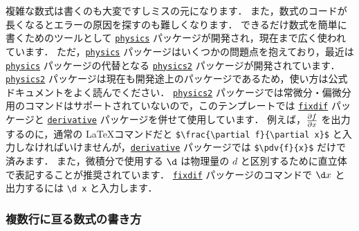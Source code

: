 \documentclass[
    paper=a4paper,      %
    article,            %
    fontsize=11pt,      %
    jafontsize=11pt,    %
    head_space=25mm,    %
    foot_space=25mm,    %
    gutter=20mm,        %
    fore-edge=20mm      %
    ]{jlreq}            %
\begin{document}
複雑な数式は書くのも大変ですしミスの元になります．
また，数式のコードが長くなるとエラーの原因を探すのも難しくなります．
できるだけ数式を簡単に書くためのツールとして \href{https://ctan.org/pkg/physics}{\texttt{physics}} パッケージが開発され，現在まで広く使われています．
ただ，\href{https://ctan.org/pkg/physics}{\texttt{physics}} パッケージはいくつかの問題点を抱えており，最近は \href{https://ctan.org/pkg/physics}{\texttt{physics}} パッケージの代替となる \href{https://ctan.org/pkg/physics2}{\texttt{physics2}} パッケージが開発されています．
\href{https://ctan.org/pkg/physics2}{\texttt{physics2}} パッケージは現在も開発途上のパッケージであるため，使い方は公式ドキュメントをよく読んでください．
\href{https://ctan.org/pkg/physics2}{\texttt{physics2}} パッケージでは常微分・偏微分用のコマンドはサポートされていないので，このテンプレートでは \href{https://ctan.org/pkg/fixdif}{\texttt{fixdif}} パッケージと \href{https://ctan.org/pkg/derivative}{\texttt{derivative}} パッケージを併せて使用しています．
例えば，$\pdv{f}{x}$ を出力するのに，通常の \LaTeX コマンドだと \verb|$\frac{\partial f}{\partial x}$| と入力しなければいけませんが，\href{https://ctan.org/pkg/derivative}{\texttt{derivative}} パッケージでは \verb|$\pdv{f}{x}$| だけで済みます．
また，微積分で使用する $\d$ は物理量の $d$ と区別するために直立体で表記することが推奨されています．
\href{https://ctan.org/pkg/fixdif}{\texttt{fixdif}} パッケージのコマンドで $\d x$ と出力するには \verb|\d x| と入力します．

\subsubsection{複数行に亘る数式の書き方}
\label{sssec:math-multiline}
\end{document}
